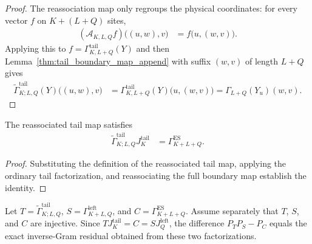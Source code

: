 \begin{proof}
    \leanok
    The reassociation map only regroups the physical coordinates:
    for every vector $f$ on $K+(L+Q)$ sites,
    \begin{align}
        (\mathscr A_{K,L,Q}f)\bigl((u,w),v\bigr)
         & =f\bigl(u,(w,v)\bigr).
    \end{align}
    Applying this to $f=\Gamma^{\mathrm{tail}}_{K,L+Q}(Y)$ and then
    Lemma~\ref{thm:tail_boundary_map_append} with suffix $(w,v)$ of
    length $L+Q$ gives
    \begin{align}
        \widetilde\Gamma^{\mathrm{tail}}_{K;L,Q}(Y)\bigl((u,w),v\bigr)
         & =\Gamma^{\mathrm{tail}}_{K,L+Q}(Y)\bigl(u,(w,v)\bigr)
        =\Gamma_{L+Q}(Y_u)(w,v).
    \end{align}
\end{proof}

\begin{lemma}
    \label{thm:reassociated_tail_boundary_factorization}
    \leanok
    The reassociated tail map satisfies
    \begin{align}
        \widetilde\Gamma^{\mathrm{tail}}_{K;L,Q}
        J_K^{\mathrm{tail}}
         & =\Gamma_{K+L+Q}^{\mathrm{ES}}.
    \end{align}
\end{lemma}

\begin{proof}
    \leanok
    Substituting the definition of the reassociated tail map, applying the
    ordinary tail factorization, and reassociating the full boundary map
    establish the identity.
\end{proof}

\begin{lemma}
    \label{thm:whole_increment_projector_residual}
    \leanok
    Let $T=\widetilde\Gamma^{\mathrm{tail}}_{K;L,Q}$,
    $S=\Gamma^{\mathrm{left}}_{K+L,Q}$, and
    $C=\Gamma_{K+L+Q}^{\mathrm{ES}}$.  Assume separately that $T$, $S$, and
    $C$ are injective.  Since
    $TJ_K^{\mathrm{tail}}=C=SJ_Q^{\mathrm{left}}$, the difference
    $P_TP_S-P_C$ equals the exact inverse-Gram residual obtained from these two
    factorizations.
\end{lemma}

